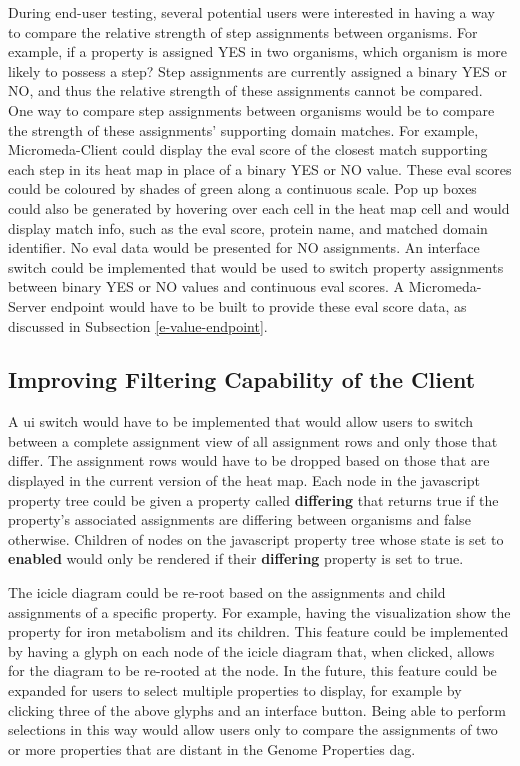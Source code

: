 During end-user testing, several potential users were interested in having a way 
to compare the relative strength of step assignments between organisms. For 
example, if a property is assigned YES in two organisms, which organism is more 
likely to possess a step? Step assignments are currently assigned a binary YES 
or NO, and thus the relative strength of these assignments cannot be compared. 
One way to compare step assignments between organisms would be to compare the 
strength of these assignments' supporting domain matches. For example, 
Micromeda-Client could display the \gls{eval} score of the closest match 
supporting each step in its heat map in place of a binary YES or NO value. These 
\gls{eval} scores could be coloured by shades of green along a continuous scale. 
Pop up boxes could also be generated by hovering over each cell in the heat map 
cell and would display match info, such as the \gls{eval} score, protein name, 
and matched domain identifier. No \gls{eval} data would be presented for NO 
assignments. An interface switch could be implemented that would be used to 
switch property assignments between binary YES or NO values and continuous 
\gls{eval} scores. A Micromeda-Server endpoint would have to be built to provide 
these \gls{eval} score data, as discussed in Subsection \ref{e-value-endpoint}.

\subsection{Improving Filtering Capability of the Client}

A \gls{ui} switch would have to be implemented that would allow users to switch 
between a complete assignment view of all assignment rows and only those that 
differ. The assignment rows would have to be dropped based on those that are 
displayed in the current version of the heat map. Each node in the 
\gls{javascript} property tree could be given a property called 
\textbf{differing} that returns true if the property's associated assignments 
are differing between organisms and false otherwise. Children of nodes on the 
\gls{javascript} property tree whose state is set to \textbf{enabled} would only 
be rendered if their \textbf{differing} property is set to true.

The icicle diagram could be re-root based on the assignments and child 
assignments of a specific property. For example, having the visualization show 
the property for iron metabolism and its children. This feature could be 
implemented by having a glyph on each node of the icicle diagram that, when 
clicked, allows for the diagram to be re-rooted at the node. In the future, this 
feature could be expanded for users to select multiple properties to display, 
for example by clicking three of the above glyphs and an interface button. Being 
able to perform selections in this way would allow users only to compare the 
assignments of two or more properties that are distant in the Genome Properties 
\gls{dag}.

